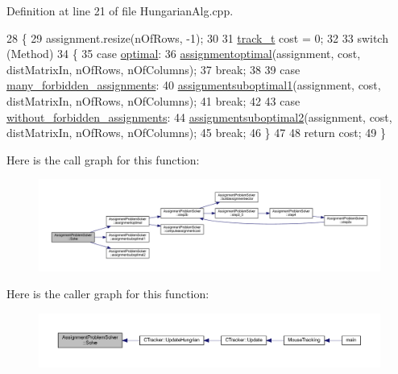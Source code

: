 Definition at line 21 of file Hungarian\+Alg.\+cpp.


\begin{DoxyCode}
28 \{
29     assignment.resize(nOfRows, -1);
30 
31     \mbox{\hyperlink{defines_8h_a7ce9c8817b42ab418e61756f579549ab}{track\_t}} cost = 0;
32 
33     \textcolor{keywordflow}{switch} (Method)
34     \{
35     \textcolor{keywordflow}{case} \mbox{\hyperlink{class_assignment_problem_solver_aec407eb73fed9d3ddb9467fde90a85e8a84f2334f61866dba64befa6910848d75}{optimal}}:
36         \mbox{\hyperlink{class_assignment_problem_solver_a5b84a5167984db1050821926f52b5187}{assignmentoptimal}}(assignment, cost, distMatrixIn, nOfRows, nOfColumns);
37         \textcolor{keywordflow}{break};
38 
39     \textcolor{keywordflow}{case} \mbox{\hyperlink{class_assignment_problem_solver_aec407eb73fed9d3ddb9467fde90a85e8a226c2e4b79d0beeb342087880d97bb2a}{many\_forbidden\_assignments}}:
40         \mbox{\hyperlink{class_assignment_problem_solver_ae8fddfafc7387f3597493f02e8366883}{assignmentsuboptimal1}}(assignment, cost, distMatrixIn, nOfRows, nOfColumns);
41         \textcolor{keywordflow}{break};
42 
43     \textcolor{keywordflow}{case} \mbox{\hyperlink{class_assignment_problem_solver_aec407eb73fed9d3ddb9467fde90a85e8a3329e7571829a83b21be4821df62310d}{without\_forbidden\_assignments}}:
44         \mbox{\hyperlink{class_assignment_problem_solver_a31277dc88cb22e07db1e52b6fe88f84f}{assignmentsuboptimal2}}(assignment, cost, distMatrixIn, nOfRows, nOfColumns);
45         \textcolor{keywordflow}{break};
46     \}
47 
48     \textcolor{keywordflow}{return} cost;
49 \}
\end{DoxyCode}
Here is the call graph for this function\+:\nopagebreak
\begin{figure}[H]
\begin{center}
\leavevmode
\includegraphics[width=350pt]{class_assignment_problem_solver_a38198467ca647403c40be2c2bb47e177_cgraph}
\end{center}
\end{figure}
Here is the caller graph for this function\+:\nopagebreak
\begin{figure}[H]
\begin{center}
\leavevmode
\includegraphics[width=350pt]{class_assignment_problem_solver_a38198467ca647403c40be2c2bb47e177_icgraph}
\end{center}
\end{figure}
\mbox{\label{class_assignment_problem_solver_adef6ec1494dd6058fdf1373bc2c6d6eb}} 
